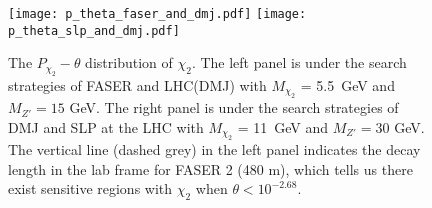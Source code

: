 \documentclass[preprint, superscriptaddress,amsmath, nofootinbib]{revtex4-1}
\begin{document}

\begin{figure}[t!]
\centering
\texttt{[image: p\_theta\_faser\_and\_dmj.pdf]}
\texttt{[image: p\_theta\_slp\_and\_dmj.pdf]}
\caption{The $P_{\chi_2}-\theta$ distribution of $\chi_2$. The left panel is under the search strategies of FASER and LHC(DMJ) with $M_{\chi_2}$ = 5.5\ GeV and $M_{Z'} = 15$ GeV. The right panel is under the search strategies of DMJ and SLP at the LHC with $M_{\chi_2}$ = 11\ GeV and $M_{Z'} = 30$ GeV. The vertical line (dashed grey) in the left panel indicates the decay length in the lab frame for FASER 2 (480 m), which tells us there exist sensitive regions with $\chi_2$ when $\theta<10^{-2.68}$.} 
\label{fig:3}
\end{figure}
\end{document}

